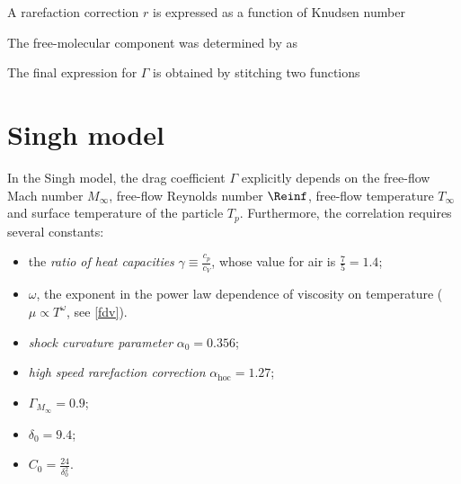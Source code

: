 
    A rarefaction correction $r$ is expressed as a function of Knudsen number


    The free-molecular component was determined by \citet{patterson1971} as

    The final expression for $\Gamma$ is obtained by stitching two functions

\section{Singh model} \label{DS}
    In the Singh model, the drag coefficient $\Gamma$ explicitly depends on the
    free-flow Mach number $M_\infty$, free-flow Reynolds number $\Reinf$,
    free-flow temperature $T_\infty$ and surface temperature of the particle $T_p$.
    Furthermore, the correlation requires several constants:
    \begin{itemize}
        \item the \emph{ratio of heat capacities} $\gamma \equiv \frac{c_p}{c_V}$,
            whose value for air is $\frac{7}{5} = \num{1.4}$;
        \item $\omega$, the exponent in the power law dependence
            of viscosity on temperature ($\mu \propto T^\omega$, see \cref{fdv}).
        \item \emph{shock curvature parameter} $\alpha_0 = \num{0.356}$;
        \item \emph{high speed rarefaction correction} $\alpha_\mathrm{hoc} = \num{1.27}$;
        \item \emph{} $\Gamma_{M_\infty} = \num{0.9}$;
        \item \emph{} $\delta_0 = \num{9.4}$;
        \item $C_0 = \frac{24}{\delta_0^2}$.
    \end{itemize}

